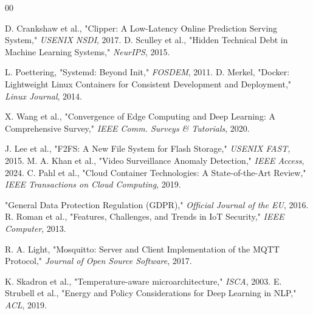 \documentclass[conference]{IEEEtran}
\begin{document}
\begin{thebibliography}{00}

 D. Crankshaw et al., "Clipper: A Low-Latency Online Prediction Serving System," \textit{USENIX NSDI}, 2017.
 D. Sculley et al., "Hidden Technical Debt in Machine Learning Systems," \textit{NeurIPS}, 2015.

 L. Poettering, "Systemd: Beyond Init," \textit{FOSDEM}, 2011.
 D. Merkel, "Docker: Lightweight Linux Containers for Consistent Development and Deployment," \textit{Linux Journal}, 2014.

 X. Wang et al., "Convergence of Edge Computing and Deep Learning: A Comprehensive Survey," \textit{IEEE Comm. Surveys \& Tutorials}, 2020.

 J. Lee et al., "F2FS: A New File System for Flash Storage," \textit{USENIX FAST}, 2015.
 M. A. Khan et al., "Video Surveillance Anomaly Detection," \textit{IEEE Access}, 2024.
 C. Pahl et al., "Cloud Container Technologies: A State-of-the-Art Review," \textit{IEEE Transactions on Cloud Computing}, 2019.

 "General Data Protection Regulation (GDPR)," \textit{Official Journal of the EU}, 2016.
 R. Roman et al., "Features, Challenges, and Trends in IoT Security," \textit{IEEE Computer}, 2013.

 R. A. Light, "Mosquitto: Server and Client Implementation of the MQTT Protocol," \textit{Journal of Open Source Software}, 2017.

 K. Skadron et al., "Temperature-aware microarchitecture," \textit{ISCA}, 2003.
 E. Strubell et al., "Energy and Policy Considerations for Deep Learning in NLP," \textit{ACL}, 2019.

\end{thebibliography}
\end{document}
